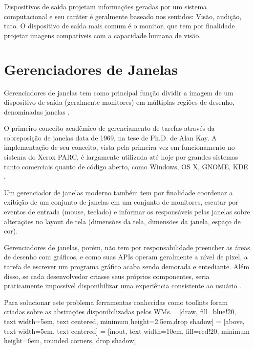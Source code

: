 Dispositivos de saída projetam informações geradas por um sistema computacional
e seu caráter é geralmente baseado nos sentidos: Visão, audição, tato. O
dispositivo de saída mais comum é o monitor, que tem por finalidade projetar
imagens compatíveis com a capacidade humana de visão.

\section{Gerenciadores de Janelas}

Gerenciadores de janelas tem como principal função dividir a imagem de um
dispositivo de saída (geralmente monitores) em múltiplas regiões de desenho,
denominadas janelas \cite[p. 5]{myers1996uimss}.

O primeiro conceito acadêmico de gerenciamento de tarefas através da
sobreposição de janelas data de 1969, na tese de Ph.D. de Alan Kay. A
implementação de seu conceito, vista pela primeira vez em funcionamento no
sistema do Xerox PARC, é largamente utilizada até hoje por grandes sistemas
tanto comerciais quanto de código aberto, como Windows, OS X, GNOME, KDE
\cite[p. 7]{myers2000past}.

Um gerenciador de janelas moderno também tem por finalidade coordenar a exibição
de um conjunto de janelas em um conjunto de monitores, escutar por eventos de
entrada (mouse, teclado) e informar os responsáveis pelas janelas sobre
alterações no layout de tela (dimensões da tela, dimensões da janela, espaço de
cor).

Gerenciadores de janelas, porém, não tem por responsabilidade preencher as áreas
de desenho com gráficos, e como suas APIs operam geralmente a nível de pixel, a
tarefa de escrever um programa gráfico acaba sendo demorada e entediante. Além
disso, se cada desenvolvedor criasse seus próprios componentes, seria
praticamente impossível disponibilizar uma experiência consistente ao usuário
.

Para solucionar este problema ferramentas conhecidas como toolkits foram criadas
sobre as abstrações disponibilizadas pelos WMs.
=[draw, fill=blue!20, text width=5em,
    text centered, minimum height=2.5em,drop shadow]
 = [above, text width=5em, text centered]
 = [inout, text width=10em, fill=red!20,
    minimum height=6em, rounded corners, drop shadow]

\def\blockdist{2.3}
\def\edgedist{2.5}

